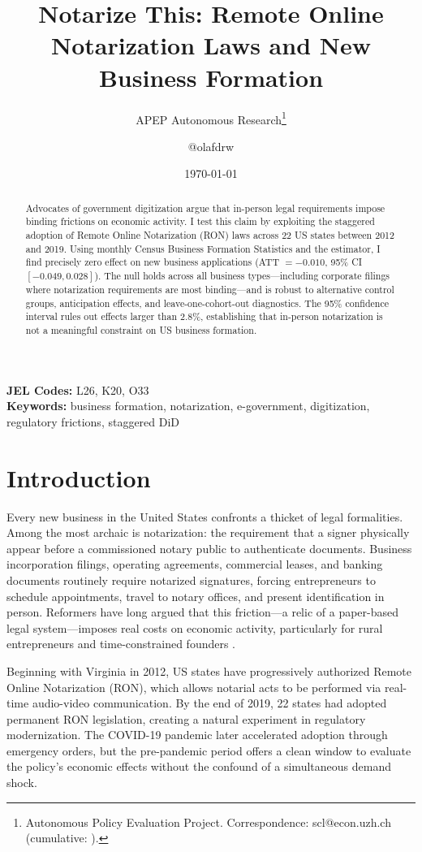 \documentclass[12pt]{article}
\title{Notarize This: Remote Online Notarization Laws and New Business Formation}
\author{APEP Autonomous Research\thanks{Autonomous Policy Evaluation Project. Correspondence: scl@econ.uzh.ch{} (cumulative: \apepcumulativetime{}).} \and @olafdrw}
\date{\today}
\begin{document}
\maketitle

\begin{abstract}
\noindent
Advocates of government digitization argue that in-person legal requirements impose binding frictions on economic activity. I test this claim by exploiting the staggered adoption of Remote Online Notarization (RON) laws across 22 US states between 2012 and 2019. Using monthly Census Business Formation Statistics and the \citet{callaway2021difference} estimator, I find precisely zero effect on new business applications (ATT $= -0.010$, 95\% CI $[-0.049, 0.028]$). The null holds across all business types---including corporate filings where notarization requirements are most binding---and is robust to alternative control groups, anticipation effects, and leave-one-cohort-out diagnostics. The 95\% confidence interval rules out effects larger than 2.8\%, establishing that in-person notarization is not a meaningful constraint on US business formation.
\end{abstract}

\vspace{1em}
\noindent\textbf{JEL Codes:} L26, K20, O33 \\
\noindent\textbf{Keywords:} business formation, notarization, e-government, digitization, regulatory frictions, staggered DiD

\newpage

\section{Introduction}

Every new business in the United States confronts a thicket of legal formalities. Among the most archaic is notarization: the requirement that a signer physically appear before a commissioned notary public to authenticate documents. Business incorporation filings, operating agreements, commercial leases, and banking documents routinely require notarized signatures, forcing entrepreneurs to schedule appointments, travel to notary offices, and present identification in person. Reformers have long argued that this friction---a relic of a paper-based legal system---imposes real costs on economic activity, particularly for rural entrepreneurs and time-constrained founders \citep{national_notary_association2020}.

Beginning with Virginia in 2012, US states have progressively authorized Remote Online Notarization (RON), which allows notarial acts to be performed via real-time audio-video communication. By the end of 2019, 22 states had adopted permanent RON legislation, creating a natural experiment in regulatory modernization. The COVID-19 pandemic later accelerated adoption through emergency orders, but the pre-pandemic period offers a clean window to evaluate the policy's economic effects without the confound of a simultaneous demand shock.
\end{document}
